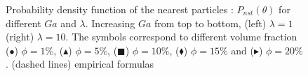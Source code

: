 \begin{figure}
    \centering
    \caption{Probability density function of the nearest particles : $P_{nst}(\theta)$ for different $Ga$ and $\lambda$. 
    Increasing $Ga$ from top to bottom, (left) $\lambda = 1$ (right) $\lambda = 10$. 
    The symbols correspond to different volume fraction ($\bullet$) $\phi = 1\%$, ($\blacktriangle$) $\phi = 5\%$, ($\blacksquare$) $\phi = 10\%$, ($\blacklozenge$) $\phi = 15\%$ and ($\blacktriangleright$) $\phi = 20\%$.
    (dashed lines) empirical formulas }
    \label{fig:P_nst_theta}
\end{figure}

